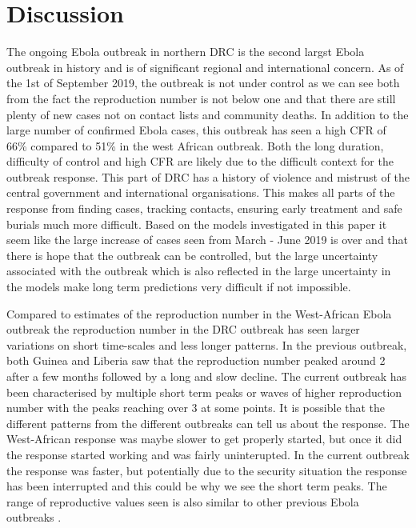 \documentclass[12pt]{article}
\begin{document}
\section{Discussion}


The ongoing Ebola outbreak in northern DRC is the second largst Ebola outbreak in history and is of significant regional and international concern. As of the 1st of September 2019, the outbreak is not under control as we can see both from the fact the reproduction number is not below one and that there are still plenty of new cases not on contact lists and community deaths\cite{worldhealthorganisationDiseaseOutbreakNews}. In addition to the large number of confirmed Ebola cases, this outbreak has seen a high CFR of 66\% compared to 51\% in the west African outbreak\cite{rojekSystematicReviewMetaanalysis2019}. Both the long duration, difficulty of control and high CFR are likely due to the difficult context for the outbreak response. This part of DRC has a history of violence and mistrust of the central government and international organisations. This makes all parts of the response from finding cases, tracking contacts, ensuring early treatment and safe burials much more difficult. Based on the models investigated in this paper it seem like the large increase of cases seen from March - June 2019 is over and that there is hope that the outbreak can be controlled, but the large uncertainty associated with the outbreak which is also reflected in the large uncertainty in the models make long term predictions very difficult if not impossible.

Compared to estimates of the reproduction number in the West-African Ebola outbreak\cite{WestAfricanEbola2015} the reproduction number in the DRC outbreak has seen larger variations on short time-scales and less longer patterns. In the previous outbreak, both Guinea and Liberia saw that the reproduction number peaked around 2 after a few months followed by a long and slow decline. The current outbreak has been characterised by multiple short term peaks or waves of higher reproduction number with the peaks reaching over 3 at some points. It is possible that the different patterns from the different outbreaks can tell us about the response. The West-African response was maybe slower to get properly started, but once it did the response started working and was fairly uninterupted. In the current outbreak the response was faster, but potentially due to the security situation the response has been interrupted and this could be why we see the short term peaks. The range of reproductive values seen is also similar to other previous Ebola outbreaks \cite{legrandUnderstandingDynamicsEbola2007}.
\end{document}
